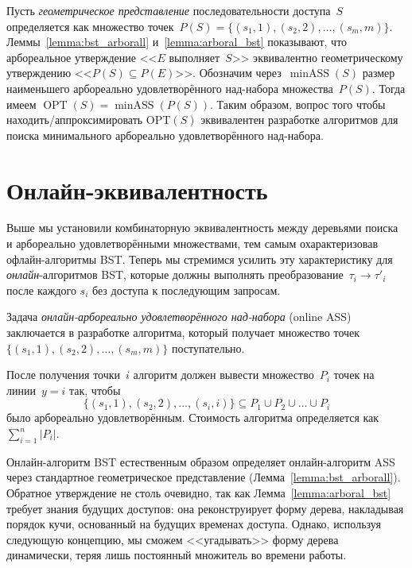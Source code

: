 \documentclass[a4paper,11pt]{article}
\begin{document}
Пусть \emph{геометрическое представление} последовательности доступа~$S$ определяется как множество точек~$P(S) = \{(s_1,1), (s_2,2), \dots, (s_m,m)\}$. 
Леммы~\ref{lemma:bst_arborall} и~\ref{lemma:arboral_bst} показывают, что арбореальное утверждение <<$E$ выполняет~$S$>> эквивалентно геометрическому утверждению <<$P(S) \subseteq P(E)$>>. 
Обозначим через~$\operatorname{minASS}(S)$ размер наименьшего арбореально удовлетворённого над-набора множества~$P(S)$. Тогда имеем $\operatorname{OPT}(S) = \operatorname{minASS}(P(S))$. Таким образом, вопрос того чтобы находить/аппроксимировать $\mathrm{OPT}(S)$ эквивалентен разработке алгоритмов для поиска минимального арбореально удовлетворённого над-набора.

\section{Онлайн-эквивалентность} 

Выше мы установили комбинаторную эквивалентность между деревьями поиска и арбореально удовлетворёнными множествами, тем самым охарактеризовав офлайн-алгоритмы BST. 
Теперь мы стремимся усилить эту характеристику для \emph{онлайн}-алгоритмов BST, которые должны выполнять преобразование~$\tau_i \to \tau'_i$ после каждого $s_i$ без доступа к последующим запросам.

\begin{definition}
Задача \emph{онлайн-арбореально удовлетворённого над-набора} (online ASS) заключается в разработке алгоритма, который получает множество точек~$\{(s_1,1), (s_2,2), \dots, (s_m,m)\}$ поступательно. 

После получения точки~$i$ алгоритм должен вывести множество~$P_i$ точек на линии~$y = i$ так, чтобы 
\[
\{(s_1,1), (s_2,2), \dots, (s_i,i)\} \subseteq P_1 \cup P_2 \cup \dots \cup P_i
\]
было арбореально удовлетворённым. Стоимость алгоритма определяется как~$\sum_{i=1}^{n} |P_i|$.
\end{definition}


Онлайн-алгоритм BST естественным образом определяет онлайн-алгоритм ASS через стандартное геометрическое представление (Лемма~\ref{lemma:bst_arborall}). Обратное утверждение не столь очевидно, так как Лемма~\ref{lemma:arboral_bst} требует знания будущих доступов: она реконструирует форму дерева, накладывая порядок кучи, основанный на будущих временах доступа. Однако, используя следующую концепцию, мы сможем <<угадывать>> форму дерева динамически, теряя лишь постоянный множитель во времени работы.
\end{document}

